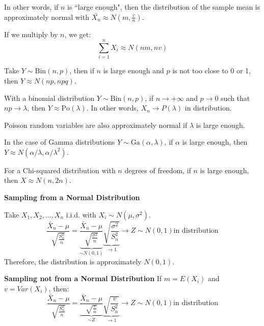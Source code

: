 In other words, if $n$ is ``large enough", then the distribution of the sample mean is approximately normal with $\bar{X_n} \approx N(m, \frac{v}{n})$.

If we multiply by $n$, we get:
\[
\sum_{i=1}^{n} X_i \approx N(nm, nv)
\]

Take $Y \sim \text{Bin}(n,p)$, then if $n$ is large enough and $p$ is not too close to 0 or 1, then $Y \approx N(np, npq)$.

With a binomial distribution $Y \sim \text{Bin}(n,p)$, if $n \to +\infty$ and $p \to 0$ such that $np \to \lambda$, then $Y \approx \text{Po}(\lambda)$. In other words, $X_n \to P(\lambda)$ in distribution.

Poisson random variables are also approximately normal if $\lambda$ is large enough.

In the case of Gamma distributions $Y\sim \text{Ga}(\alpha, \lambda)$, if $\alpha$ is large enough, then $Y \approx N(\alpha/\lambda, \alpha/\lambda^2)$.

For a Chi-squared distribution with $n$ degrees of freedom, if $n$ is large enough, then $X \approx N(n, 2n)$.


\textbf{Sampling from a Normal Distribution}

Take $X_1, X_2, \ldots , X_n$ i.i.d. with $X_i \sim N(\mu, \sigma^2)$.
\[
\frac{\bar{X}_n - \mu}{\sqrt{\frac{S_n^2}{n}}} = \underbrace{\frac{\bar{X}_n - \mu}{\sqrt{\frac{\sigma^2}{n}}}}_{\sim N(0,1)} \underbrace{\sqrt{\frac{\sigma^2}{S_n^2}}}_{\to 1} \to Z \sim N(0,1) \text{in distribution}
\]
Therefore, the distribution is approximately $N(0,1)$.

\textbf{Sampling not from a Normal Distribution}
If $m = E(X_i)$ and $v = Var(X_i)$, then:
\[
\frac{\bar{X}_n - \mu}{\sqrt{\frac{S_n^2}{n}}} = \underbrace{\frac{\bar{X}_n - \mu}{\sqrt{\frac{v}{n}}}}_{\sim Z} \underbrace{\sqrt{\frac{v}{S_n^2}}}_{\to 1} \to Z \sim N(0,1) \text{in distribution}
\]

